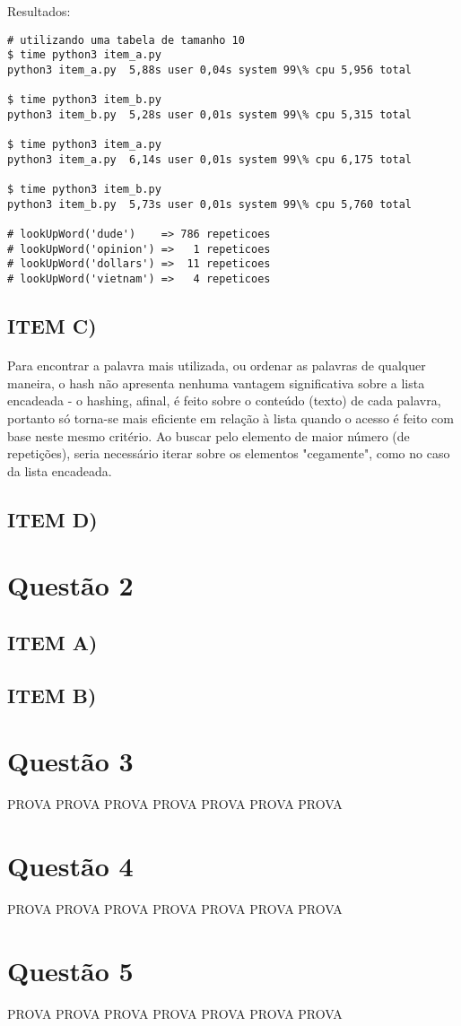 \documentclass[12pt, letterpaper]{article}
\begin{document}
Resultados:

\begin{lstlisting}
# utilizando uma tabela de tamanho 10
$ time python3 item_a.py
python3 item_a.py  5,88s user 0,04s system 99\% cpu 5,956 total

$ time python3 item_b.py
python3 item_b.py  5,28s user 0,01s system 99\% cpu 5,315 total

$ time python3 item_a.py
python3 item_a.py  6,14s user 0,01s system 99\% cpu 6,175 total

$ time python3 item_b.py
python3 item_b.py  5,73s user 0,01s system 99\% cpu 5,760 total

# lookUpWord('dude')    => 786 repeticoes
# lookUpWord('opinion') =>   1 repeticoes
# lookUpWord('dollars') =>  11 repeticoes
# lookUpWord('vietnam') =>   4 repeticoes
\end{lstlisting}

\subsection{ITEM C)}
\paragraph{}
Para encontrar a palavra mais utilizada, ou ordenar as palavras de qualquer maneira,
o hash não apresenta nenhuma vantagem significativa sobre a lista encadeada - o hashing,
afinal, é feito sobre o conteúdo (texto) de cada palavra, portanto só torna-se mais
eficiente em relação à lista quando o acesso é feito com base neste mesmo critério.
Ao buscar pelo elemento de maior número (de repetições), seria necessário iterar sobre os
elementos "cegamente", como no caso da lista encadeada.

\subsection{ITEM D)}

\newpage
\section{Questão 2}
\subsection{ITEM A)}

\subsection{ITEM B)}

\newpage
\section{Questão 3}
PROVA PROVA PROVA PROVA PROVA PROVA PROVA

\newpage
\section{Questão 4}
PROVA PROVA PROVA PROVA PROVA PROVA PROVA

\newpage
\section{Questão 5}
PROVA PROVA PROVA PROVA PROVA PROVA PROVA
\end{document}
